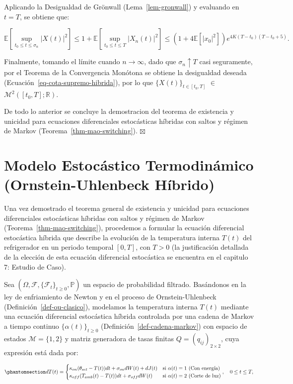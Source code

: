 \documentclass[
  spanish,
  us-letterpaper,
]{scrreprt}
\numberwithin{equation}{section}
\theoremstyle{plain}
\theoremstyle{plain}
\theoremstyle{plain}
\theoremstyle{definition}
\theoremstyle{remark}
\begin{document}
Aplicando la Desigualdad de Grönwall (Lema~\ref{lem-gronwall}) y
evaluando en \(t = T\), se obtiene que:

\[
\mathbb{E}\left[ \sup_{t_0 \le t \le \sigma_n} \vert X(t) \vert^2 \right] \le 1 + \mathbb{E}\left[ \sup_{t_0 \le t \le T} \vert X_n(t) \vert^2 \right] \le \left( 1 + 4\mathbb{E}[\vert x_0 \vert^2] \right) e^{4K(T - t_0)(T - t_0 + 5)}.
\]

Finalmente, tomando el límite cuando \(n \to \infty\), dado que
\(\sigma_n \uparrow T\) casi seguramente, por el Teorema de la
Convergencia Monótona se obtiene la desigualdad deseada
(Ecuación~\ref{eq-cota-supremo-hibrida}), por lo que
\(\{X(t)\}_{t \in [t_0, T]}\) \(\in\)
\(\mathcal{M}^2([t_0, T]; \mathbb{R})\).

De todo lo anterior se concluye la demostracion del teorema de
existencia y unicidad para ecuaciones diferenciales estocásticas
híbridas con saltos y régimen de Markov
(Teorema~\ref{thm-mao-switching}). \(\boxtimes\)

\section{Modelo Estocástico Termodinámico (Ornstein-Uhlenbeck
Híbrido)}\label{modelo-estocuxe1stico-termodinuxe1mico-ornstein-uhlenbeck-huxedbrido}

Una vez demostrado el teorema general de existencia y unicidad para
ecuaciones diferenciales estocásticas híbridas con saltos y régimen de
Markov (Teorema~\ref{thm-mao-switching}), procedemos a formular la
ecuación diferencial estocástica híbrida que describe la evolución de la
temperatura interna \(T(t)\) del refrigerador en un periodo temporal
\([0, T]\), con \(T > 0\) (la justificación detallada de la elección de
esta ecuación diferencial estocástica se encuentra en el capitulo 7:
Estudio de Caso).

Sea \((\Omega, \mathcal{F}, \{\mathcal{F}_t\}_{t \ge 0}, \mathbb{P})\)
un espacio de probabilidad filtrado. Basándonos en la ley de
enfriamiento de Newton y en el proceso de Ornstein-Uhlenbeck
(Definición~\ref{def-ou-clasico}), modelamos la temperatura interna
\(T(t)\) mediante una ecuación diferencial estocástica híbrida
controlada por una cadena de Markov a tiempo continuo
\(\{\alpha(t)\}_{t \ge 0}\) (Definición~\ref{def-cadena-markov}) con
espacio de estados \(\mathcal{M} = \{1, 2\}\) y matriz generadora de
tasas finitas \(Q = (q_{ij})_{2 \times 2}\), cuya expresión está dada
por:

\begin{equation}\phantomsection\label{eq-ede-operativa-teorica}{
dT(t) = 
\begin{cases} 
\kappa_{on}(\theta_{set} - T(t))dt + \sigma_{on}dW(t) + dJ(t) & \text{si } \alpha(t) = 1 \text{ (Con energía)} \\ 
\kappa_{off}(T_{amb}(t) - T(t))dt + \sigma_{off}dW(t) & \text{si } \alpha(t) = 2 \text{ (Corte de luz)} 
\end{cases}, \quad 0 \leq t \leq T,
}\end{equation}
\end{document}
